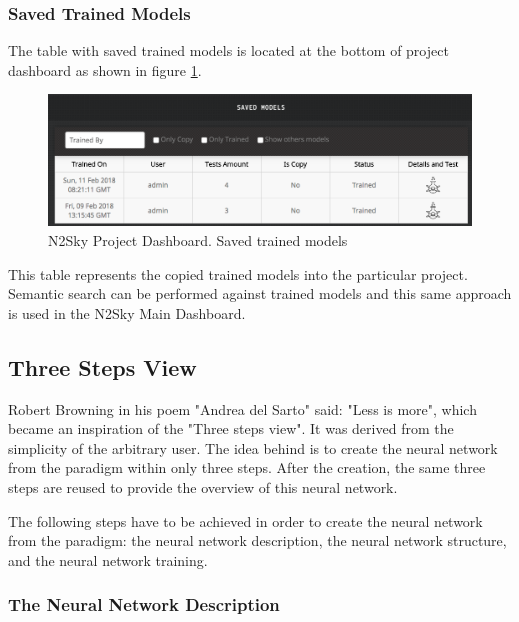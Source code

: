 \begin{itemize}
\subsubsection{Saved Trained Models}

The table with saved trained models is located at the bottom of project dashboard as shown in figure \ref{fig:saved_trained_models_project}.

\begin{figure}[H]
\begin{center}
  \includegraphics[width=\linewidth]{components/5/img/saved_trained_models_project.png}
  \caption{N2Sky Project Dashboard. Saved trained models}
  \label{fig:saved_trained_models_project}
\end{center}
\end{figure}

This table represents the copied trained models into the particular project. Semantic search can be performed against trained models and this same approach is used in the N2Sky Main Dashboard. 

\end{itemize}


\subsection{Three Steps View}\label{Three steps view}

Robert Browning in his poem "Andrea del Sarto" said: "Less is more", which became an inspiration of the "Three steps view". It was derived from the simplicity of the arbitrary user. The idea behind is to create the neural network from the paradigm within only three steps. After the creation, the same three steps are reused to provide the overview of this neural network.

The following steps have to be achieved in order to create the neural network from the paradigm:  the neural network description, the neural network structure, and the neural network training.

\subsubsection{The Neural Network Description}

